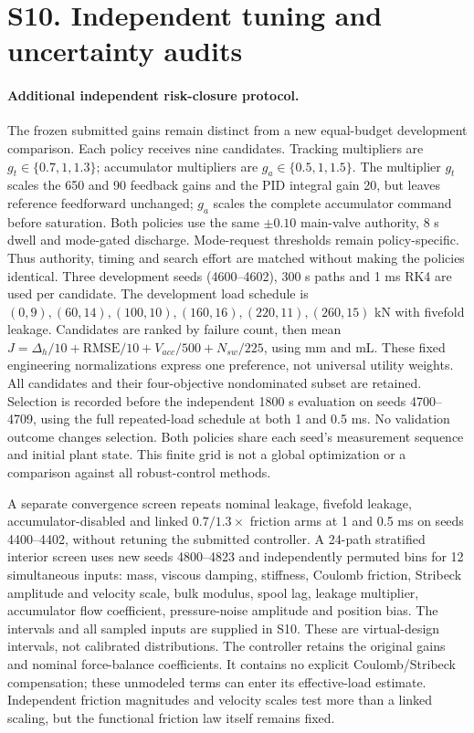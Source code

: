 \section*{S10. Independent tuning and uncertainty audits}

\paragraph{Additional independent risk-closure protocol.}
The frozen submitted gains remain distinct from a new equal-budget development comparison. Each policy receives nine candidates. Tracking multipliers are $g_t\in\{0.7,1,1.3\}$; accumulator multipliers are $g_a\in\{0.5,1,1.5\}$. The multiplier $g_t$ scales the 650 and 90 feedback gains and the PID integral gain 20, but leaves reference feedforward unchanged; $g_a$ scales the complete accumulator command before saturation. Both policies use the same $\pm0.10$ main-valve authority, 8 s dwell and mode-gated discharge. Mode-request thresholds remain policy-specific. Thus authority, timing and search effort are matched without making the policies identical. Three development seeds (4600--4602), 300 s paths and 1 ms RK4 are used per candidate. The development load schedule is $(0,9),(60,14),(100,10),(160,16),(220,11),(260,15)$ kN with fivefold leakage. Candidates are ranked by failure count, then mean $J=\Delta_h/10+\mathrm{RMSE}/10+V_{acc}/500+N_{sw}/225$, using mm and mL. These fixed engineering normalizations express one preference, not universal utility weights. All candidates and their four-objective nondominated subset are retained. Selection is recorded before the independent 1800 s evaluation on seeds 4700--4709, using the full repeated-load schedule at both 1 and 0.5 ms. No validation outcome changes selection. Both policies share each seed's measurement sequence and initial plant state. This finite grid is not a global optimization or a comparison against all robust-control methods.

A separate convergence screen repeats nominal leakage, fivefold leakage, accumulator-disabled and linked $0.7/1.3\times$ friction arms at 1 and 0.5 ms on seeds 4400--4402, without retuning the submitted controller. A 24-path stratified interior screen uses new seeds 4800--4823 and independently permuted bins for 12 simultaneous inputs: mass, viscous damping, stiffness, Coulomb friction, Stribeck amplitude and velocity scale, bulk modulus, spool lag, leakage multiplier, accumulator flow coefficient, pressure-noise amplitude and position bias. The intervals and all sampled inputs are supplied in S10. These are virtual-design intervals, not calibrated distributions. The controller retains the original gains and nominal force-balance coefficients. It contains no explicit Coulomb/Stribeck compensation; these unmodeled terms can enter its effective-load estimate. Independent friction magnitudes and velocity scales test more than a linked scaling, but the functional friction law itself remains fixed.


